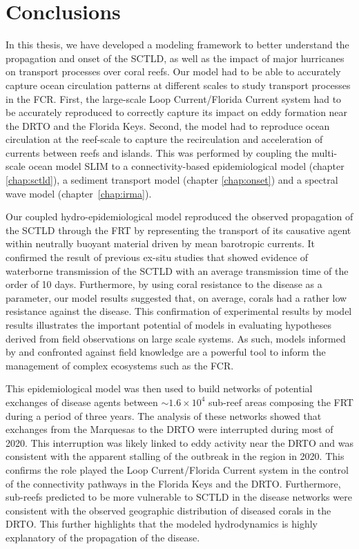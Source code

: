 \section{Conclusions}
In this thesis, we have developed a modeling framework to better understand the propagation and onset of the SCTLD, as well as the impact of major hurricanes on transport processes over coral reefs. Our model had to be able to accurately capture ocean circulation patterns at different scales to study transport processes in the FCR. First, the large-scale Loop Current/Florida Current system had to be accurately reproduced to correctly capture its impact on eddy formation near the DRTO and the Florida Keys. Second, the model had to reproduce ocean circulation at the reef-scale to capture the recirculation and acceleration of currents between reefs and islands. This was performed by coupling the multi-scale ocean model SLIM to a connectivity-based epidemiological model (chapter \ref{chap:sctld}), a sediment transport model (chapter \ref{chap:onset}) and a spectral wave model (chapter~\ref{chap:irma}).

Our coupled hydro-epidemiological model reproduced the observed propagation of the SCTLD through the FRT by representing the transport of its causative agent within neutrally buoyant material driven by mean barotropic currents. It confirmed the result of previous ex-situ studies that showed evidence of waterborne transmission of the SCTLD with an average transmission time of the order of 10 days. Furthermore, by using coral resistance to the disease as a parameter, our model results suggested that, on average, corals had a rather low resistance against the disease. This confirmation of experimental results by model results illustrates the important potential of models in evaluating hypotheses derived from field observations on large scale systems. As such, models informed by and confronted against field knowledge \citep{foster2012connectivity} are a powerful tool to inform the management of complex ecosystems such as the FCR.

This epidemiological model was then used to build networks of potential exchanges of disease agents between $\sim 1.6\times10^4$ sub-reef areas composing the FRT during a period of three years. The analysis of these networks showed that exchanges from the Marquesas to the DRTO were interrupted during most of 2020. This interruption was likely linked to eddy activity near the DRTO and was consistent with the apparent stalling of the outbreak in the region in 2020. This confirms the role played the Loop Current/Florida Current system in the control of the connectivity pathways in the Florida Keys and the DRTO. Furthermore, sub-reefs predicted to be more vulnerable to SCTLD in the disease networks were consistent with the observed geographic distribution of diseased corals in the DRTO. This further highlights that the modeled hydrodynamics is highly explanatory of the propagation of the disease.

